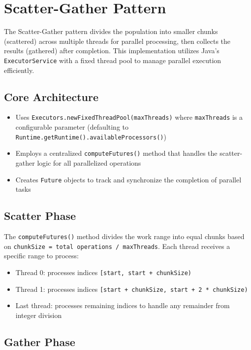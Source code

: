 \newpage

\section{Scatter-Gather Pattern}\label{sec:scatter-gather}

The Scatter-Gather pattern divides the population into smaller chunks
(scattered) across multiple threads for parallel processing, then collects the
results (gathered) after completion. This implementation utilizes Java's
\texttt{ExecutorService} with a fixed thread pool to manage parallel execution
efficiently.

\subsection{Core Architecture}

\begin{itemize}
    \item Uses \texttt{Executors.newFixedThreadPool(maxThreads)} where
    \texttt{maxThreads} is a configurable parameter (defaulting to
    \texttt{Runtime.getRuntime().availableProcessors()})
    \item Employs a centralized \texttt{computeFutures()} method that handles
    the scatter-gather logic for all parallelized operations
    \item Creates \texttt{Future} objects to track and synchronize the
    completion of parallel tasks
\end{itemize}

\subsection{Scatter Phase}
The \texttt{computeFutures()} method divides the work range into equal chunks
based on \texttt{chunkSize = total operations / maxThreads}. Each thread
receives a specific range to process:

\begin{itemize}
    \item Thread 0: processes indices \texttt{[start, start + chunkSize)}
    \item Thread 1: processes indices \texttt{[start + chunkSize, start + 2 *
    chunkSize)}
    \item Last thread: processes remaining indices to handle any remainder from
    integer division
\end{itemize}

\subsection{Gather Phase}

